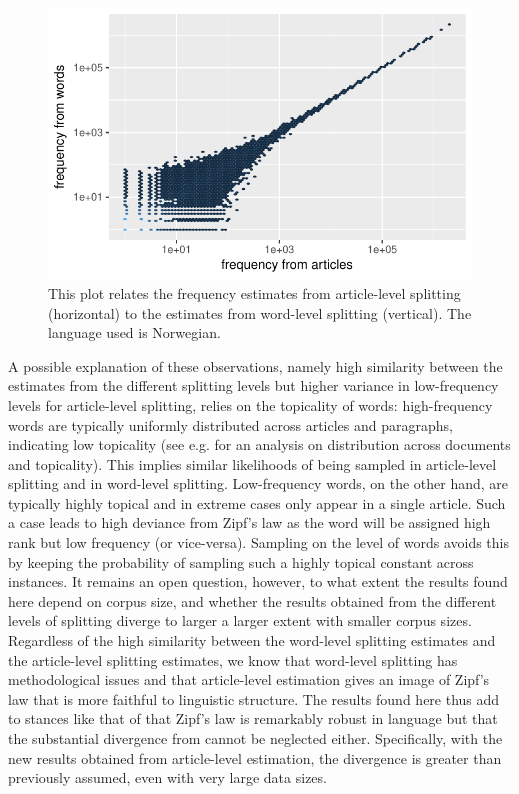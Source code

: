 \documentclass{article}
\begin{document}
\begin{figure}
	\centering
	\includegraphics[scale=0.8]{NO-count-count-corr.pdf}
	\caption{This plot relates the frequency estimates from article-level splitting (horizontal) to the estimates from word-level splitting (vertical). The language used is Norwegian.}
	\label{levels-correl}
\end{figure}


A possible explanation of these observations, namely high similarity between the estimates from the different splitting levels but higher variance in low-frequency levels for article-level splitting, relies on the topicality of words: high-frequency words are typically uniformly distributed across articles and paragraphs, indicating low topicality (see e.g. \parencite{serrano2009beyond} for an analysis on distribution across documents and topicality). This implies similar likelihoods of being sampled in article-level splitting and in word-level splitting. Low-frequency words, on the other hand, are typically highly topical and in extreme cases only appear in a single article. Such a case leads to high deviance from Zipf's law as the word will be assigned high rank but low frequency (or vice-versa). Sampling on the level of words avoids this by keeping the probability of sampling such a highly topical constant across instances. It remains an open question, however, to what extent the results found here depend on corpus size, and whether the results obtained from the different levels of splitting diverge to larger a larger extent with smaller corpus sizes.\\

Regardless of the high similarity between the word-level splitting estimates and the article-level splitting estimates, we know that word-level splitting has methodological issues and that article-level estimation gives an image of Zipf's law that is more faithful to linguistic structure. The results found here thus add to stances like that of \parencite{piantadosi2014zipf} that Zipf's law is remarkably robust in language but that the substantial divergence from cannot be neglected either. Specifically, with the new results obtained from article-level estimation, the divergence is greater than previously assumed, even with very large data sizes. 
\end{document}
